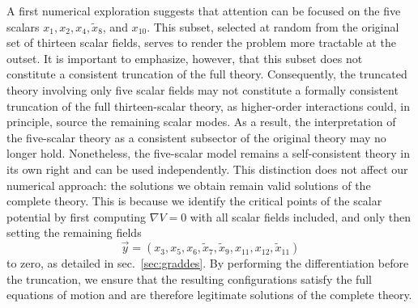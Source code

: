 \documentclass[11pt,a4paper]{article}
\begin{document}
A first numerical exploration suggests that attention can be focused on the five scalars $x_{1}, x_{2}, x_{4}, \tilde{x}_{8}$, and $x_{10}$. This subset, selected at random from the original set of thirteen scalar fields, serves to render the problem more tractable at the outset. It is important to emphasize, however, that this subset does not constitute a consistent truncation of the full theory. Consequently, the truncated theory involving only five scalar fields may not constitute a formally consistent truncation of the full thirteen-scalar theory, as higher-order interactions could, in principle, source the remaining scalar modes. As a result, the interpretation of the five-scalar theory as a consistent subsector of the original theory may no longer hold. Nonetheless, the five-scalar model remains a self-consistent theory in its own right and can be used independently. This distinction does not affect our numerical approach: the solutions we obtain remain valid solutions of the complete theory. This is because we identify the critical points of the scalar potential by first computing $\nabla V = 0$ with all scalar fields included, and only then setting the remaining fields
\begin{equation} \label{eq:defvecy}
	\vec{y} = (x_3,x_5,x_6,\tilde{x}_7,\tilde{x}_9,x_{11},x_{12},\tilde{x}_{11})
\end{equation}
to zero, as detailed in sec.~\ref{sec:graddes}. By performing the differentiation before the truncation, we ensure that the resulting configurations satisfy the full equations of motion and are therefore legitimate solutions of the complete theory.
\end{document}
